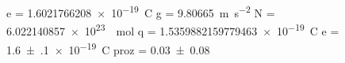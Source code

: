 e = \SI[]{1.6021766208e-19}{\coulomb}
g = \SI[]{9.80665}{\meter\per\second\squared}
N = \SI[]{6.022140857e+23}{\per\mole}
q = \SI[]{1.5359882159779463e-19}{\coulomb}
e = \SI{+1.6(1)e-19}{\coulomb}
proz = \SI{+0.03(8)}{}

